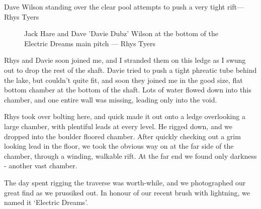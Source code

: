 \begin{marginfigure}
\checkoddpage \ifoddpage \forcerectofloat \else \forceversofloat \fi
\centering
{}
 \caption{Dave Wilson standing over the clear pool attempts to push a very tight rift--- Rhys Tyers}\label{Crystal pool}
\end{marginfigure}

\begin{figure}[t!]
\checkoddpage \ifoddpage \forcerectofloat \else \forceversofloat \fi
\centering
        \caption{Jack Hare and Dave 'Davie Dubz' Wilson at the bottom of the Electric Dreams main pitch --- Rhys Tyers} \label{Electric dreams}
\end{figure}

Rhys and Davie soon joined me, and I stranded them on this ledge as I swung out to drop the rest of the shaft. Davie tried to push a tight phreatic tube behind the lake, but couldn’t quite fit, and soon they joined me in the good size, flat bottom chamber at the bottom of the shaft. Lots of water flowed down into this chamber, and one entire wall was missing, leading only into the void.

Rhys took over bolting here, and quick made it out onto a ledge overlooking a large chamber, with plentiful leads at every level. He rigged down, and we dropped into the boulder floored chamber. After quickly checking out a grim looking lead in the floor, we took the obvious way on at the far side of the chamber, through a winding, walkable rift. At the far end we found only darkness - another vast chamber.

The day spent rigging the traverse was worth-while, and we photographed our great find as we prussiked out. In honour of our recent brush with lightning, we named it ‘Electric Dreams’.

